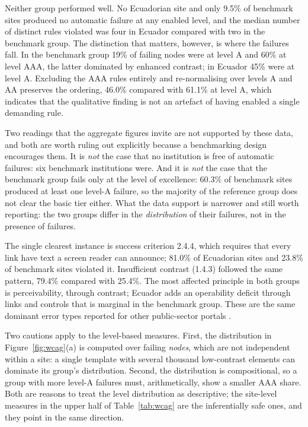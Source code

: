 \documentclass[pdflatex,sn-basic,Numbered,iicol]{sn-jnl}
\theoremstyle{thmstyleone}
\theoremstyle{thmstyletwo}
\theoremstyle{thmstylethree}
\begin{document}
	Neither group performed well. No Ecuadorian site and only 9.5\% of benchmark sites produced no automatic failure at any enabled level, and the median number of distinct rules violated was four in Ecuador compared with two in the benchmark group. The distinction that matters, however, is where the failures fall. In the benchmark group 19\% of failing nodes were at level A and 60\% at level AAA, the latter dominated by enhanced contrast; in Ecuador 45\% were at level A. Excluding the AAA rules entirely and re-normalising over levels A and AA preserves the ordering, 46.0\% compared with 61.1\% at level A, which indicates that the qualitative finding is not an artefact of having enabled a single demanding rule.
	
	Two readings that the aggregate figures invite are not supported by these data, and both are worth ruling out explicitly because a benchmarking design encourages them. It is \emph{not} the case that no institution is free of automatic failures: six benchmark institutions were. And it is \emph{not} the case that the benchmark group fails only at the level of excellence: 60.3\% of benchmark sites produced at least one level-A failure, so the majority of the reference group does not clear the basic tier either. What the data support is narrower and still worth reporting: the two groups differ in the \emph{distribution} of their failures, not in the presence of failures.
	
	The single clearest instance is success criterion 2.4.4, which requires that every link have text a screen reader can announce; 81.0\% of Ecuadorian sites and 23.8\% of benchmark sites violated it. Insufficient contrast (1.4.3) followed the same pattern, 79.4\% compared with 25.4\%. The most affected principle in both groups is perceivability, through contrast; Ecuador adds an operability deficit through links and controls that is marginal in the benchmark group. These are the same dominant error types reported for other public-sector portals \citep{iniesto2025service,aljedaani2025egovernment}.
	
	Two cautions apply to the level-based measures. First, the distribution in Figure~\ref{fig:wcag}(a) is computed over failing \emph{nodes}, which are not independent within a site: a single template with several thousand low-contrast elements can dominate its group's distribution. Second, the distribution is compositional, so a group with more level-A failures must, arithmetically, show a smaller AAA share. Both are reasons to treat the level distribution as descriptive; the site-level measures in the upper half of Table~\ref{tab:wcag} are the inferentially safe ones, and they point in the same direction.
	
\end{document}
